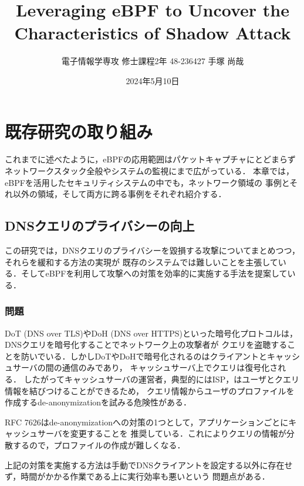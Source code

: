\documentclass[platex,a4j,10pt,twoside,twocolumn,dvipdfmx]{jsarticle}
\title{Leveraging eBPF to Uncover the Characteristics of Shadow Attack}
\author{電子情報学専攻 修士課程2年 48-236427 手塚 尚哉}
\date{2024年5月10日}
\begin{document}






\section{既存研究の取り組み}
これまでに述べたように，eBPFの応用範囲はパケットキャプチャにとどまらず
ネットワークスタック全般やシステムの監視にまで広がっている．
本章では，eBPFを活用したセキュリティシステムの中でも，ネットワーク領域の
事例とそれ以外の領域，そして両方に跨る事例をそれぞれ紹介する．

\subsection{DNSクエリのプライバシーの向上 \cite{rivera2020leveraging}}
この研究では，DNSクエリのプライバシーを毀損する攻撃についてまとめつつ，それらを緩和する方法の実現が
既存のシステムでは難しいことを主張している．そしてeBPFを利用して攻撃への対策を効率的に実施する手法を提案している．

\subsubsection{問題}
DoT (DNS over TLS)やDoH (DNS over HTTPS)といった暗号化プロトコルは，DNSクエリを暗号化することでネットワーク上の攻撃者が
クエリを盗聴することを防いでいる．しかしDoTやDoHで暗号化されるのはクライアントとキャッシュサーバの間の通信のみであり，
キャッシュサーバ上でクエリは復号化される．
したがってキャッシュサーバの運営者，典型的にはISP，はユーザとクエリ情報を結びつけることができるため，
クエリ情報からユーザのプロファイルを作成するde-anonymizationを試みる危険性がある．

RFC 7626はde-anonymizationへの対策の1つとして，アプリケーションごとにキャッシュサーバを変更することを
推奨している．これによりクエリの情報が分散するので，プロファイルの作成が難しくなる．

上記の対策を実施する方法は手動でDNSクライアントを設定する以外に存在せず，時間がかかる作業である上に実行効率も悪いという
問題点がある．
\end{document}
